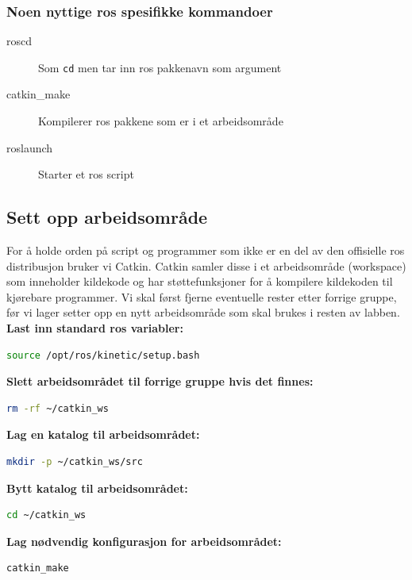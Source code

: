 \documentclass{article}
\begin{document}
\subsubsection*{Noen nyttige \gls{ros} spesifikke kommandoer}
\begin{description}
\item[roscd] Som \texttt{cd} men tar inn \gls{ros} pakkenavn som argument
\item[catkin\_make] Kompilerer \gls{ros} pakkene som er i et arbeidsområde
\item[roslaunch] Starter et \gls{ros} script
\end{description}

\subsection{Sett opp arbeidsområde}
For å holde orden på script og programmer som ikke er en del av den offisielle \gls{ros} distribusjon bruker vi Catkin.
Catkin samler disse i et arbeidsområde (workspace) som inneholder kildekode og har støttefunksjoner for å kompilere kildekoden  til kjørebare programmer. Vi skal først fjerne eventuelle rester etter forrige gruppe, før vi lager setter opp en nytt arbeidsområde som skal brukes i resten av labben. \\
 
 
\noindent\textbf{Last inn standard \gls{ros} variabler:}
\begin{lstlisting}[language=bash]
source /opt/ros/kinetic/setup.bash
\end{lstlisting}

\noindent\textbf{Slett arbeidsområdet til forrige gruppe hvis det finnes:}
\begin{lstlisting}[language=bash]
rm -rf ~/catkin_ws
\end{lstlisting}

\noindent\textbf{Lag en katalog til arbeidsområdet:}
\begin{lstlisting}[language=bash]
mkdir -p ~/catkin_ws/src
\end{lstlisting}

\noindent\textbf{Bytt katalog til arbeidsområdet:}
\begin{lstlisting}[language=bash]
cd ~/catkin_ws
\end{lstlisting}

\noindent\textbf{Lag nødvendig konfigurasjon for arbeidsområdet:}
\begin{lstlisting}[language=bash]
catkin_make
\end{lstlisting}
\end{document}
